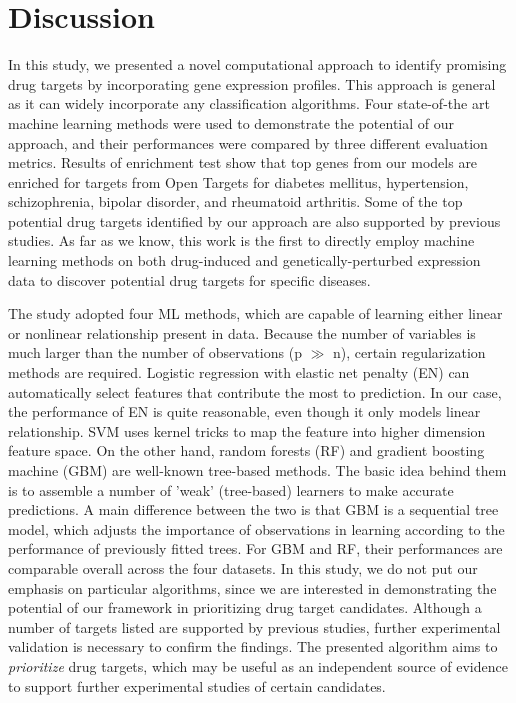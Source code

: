 \section{Discussion}
  In this study, we presented a novel computational approach to identify promising drug targets by incorporating gene expression profiles. This approach is general as it can widely incorporate any classification algorithms. Four state-of-the art machine learning methods were used to demonstrate the potential of our approach, and their performances were compared by three different evaluation metrics. Results of enrichment test show that top genes from our models are enriched for targets from Open Targets for diabetes mellitus, hypertension, schizophrenia, bipolar disorder, and rheumatoid arthritis. Some of the top potential drug targets identified by our approach are also supported by previous studies. As far as we know, this work is the first to directly employ machine learning methods on both drug-induced and genetically-perturbed expression data to discover potential drug targets for specific diseases. 

  The study adopted four ML methods, which are capable of learning either linear or nonlinear relationship present in data. Because the number of variables is much larger than the number of observations (p $\gg$ n), certain regularization methods are required. Logistic regression with elastic net penalty (EN) can automatically select features that contribute the most to prediction. In our case, the performance of EN is quite reasonable, even though it only models linear relationship. SVM uses kernel tricks to map the feature into higher dimension feature space. On the other hand, random forests (RF) and gradient boosting machine (GBM) are well-known tree-based methods. The basic idea behind them is to assemble a number of 'weak' (tree-based) learners to make accurate predictions. A main difference between the two is that GBM is a sequential tree model, which adjusts the importance of observations in learning according to the performance of previously fitted trees. For  GBM and RF, their performances are comparable overall across the four datasets. In this study, we do not put our emphasis on particular algorithms, since we are interested in demonstrating the potential of our framework in prioritizing drug target candidates. Although a number of targets listed are supported by previous studies, further experimental validation is necessary to confirm the findings. The presented algorithm aims to \textit{prioritize} drug targets, which may be useful as an independent source of evidence to  support further experimental studies of certain candidates. 

